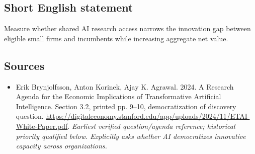 \documentclass[11pt]{article}
\begin{document}
\subsection{Short English statement}
Measure whether shared AI research access narrows the innovation gap between eligible small firms and incumbents while increasing aggregate net value.

\subsection{Sources}
\begin{itemize}\raggedright
\item[\textnormal{[S1]}]\hypertarget{source:30007694:1}{} Erik Brynjolfsson, Anton Korinek, Ajay K. Agrawal. 2024. A Research Agenda for the Economic Implications of Transformative Artificial Intelligence. Section 3.2, printed pp. 9–10, democratization of discovery question.
\url{https://digitaleconomy.stanford.edu/app/uploads/2024/11/ETAI-White-Paper.pdf}.
{\small\textit{Earliest verified question/agenda reference; historical priority qualified below. Explicitly asks whether AI democratizes innovative capacity across organizations.}}
\end{itemize}
\end{document}
